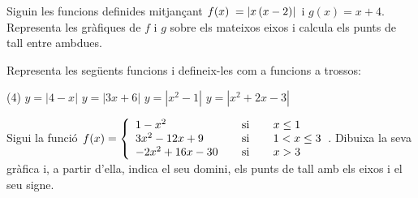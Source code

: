 \begin{mylist}
\exer Siguin les funcions definides mitjançant $f(x){\rm \; }=\left|x\left(x-2\right)\right|$ i  $g(x)=x+4$. Representa les gràfiques de $f$ i $g$ sobre els mateixos eixos i calcula els punts de tall entre ambdues.

\exer Representa les següents funcions i defineix-les com a funcions a trossos:
\begin{tasks}(4)
	\task $y=|4-x|$
	\task $y=|3x+6|$
	\task $y=|x^2-1|$
	\task $y=|x^2+2x-3|$
\end{tasks}

\exer Sigui la funció $f(x)=\left\{\begin{array}{l} {1-x^{2} } \\ {3x^{2} -12x+9} \\ {-2x^{2} +16x-30} \end{array}{\rm \; \; \; \; }\begin{array}{c} {{\rm si}} \\ {{\rm si}} \\ {{\rm si}} \end{array}\right. {\rm \; \; \; }\begin{array}{l} {x\le 1} \\ {1<x\le 3} \\ {x>3} \end{array}$. Dibuixa la seva gràfica i, a partir d'ella, indica el seu domini, els  punts de tall amb els eixos i el seu signe.

\end{mylist}

